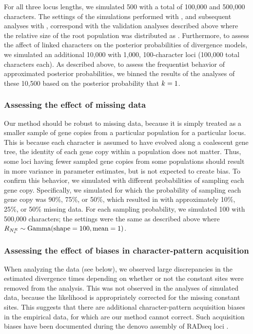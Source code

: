 For all three locus lengths, we simulated 500 \datasets with a total of 100,000
and 500,000 characters.
The settings of the simulations performed with \simcoevolity, and subsequent
analyses with \ecoevolity, correspond with the validation analyses described
above where the relative size of the root population was distributed as
.
Furthermore, to assess the affect of linked characters on the posterior
probabilities of divergence models, we simulated an additional 10,000 \datasets
with 1,000, 100-character loci (100,000 total characters each).
As described above, to assess the frequentist behavior of approximated
posterior probabilities, we binned the results of the analyses of these 10,500
\datasets based on the posterior probability that $k_{}{} = 1$.

\subsubsection{Assessing the effect of missing data}
Our method should be robust to missing data, because it is simply treated as a
smaller sample of gene copies from a particular population for a particular
locus.
This is because each character is assumed to have evolved along a coalescent
gene tree, the identity of each gene copy within a population does not matter.
Thus, some loci having fewer sampled gene copies from some populations should
result in more variance in parameter estimates, but is not expected to create
bias.
To confirm this behavior, we simulated \datasets with different probabilities of
sampling each gene copy.
Specifically, we simulated \datasets for which the probability of sampling each
gene copy was 90\%, 75\%, or 50\%, which resulted in \datasets with
approximately 10\%, 25\%, or 50\% missing data.
For each sampling probability, we simulated 100 \datasets with 500,000
characters; the settings were the same as described above where
$R_{N_{e}^{R{}}} \sim \textrm{Gamma}(\textrm{shape} = 100, \textrm{mean} = 1)$.

\subsubsection{Assessing the effect of biases in character-pattern acquisition}
When analyzing the  data (see below), we observed large
discrepancies in the estimated divergence times depending on whether or not the
constant sites were removed from the analysis.
This was not observed in the analyses of simulated data, because the likelihood
is appropriately corrected for the missing constant sites.
This suggests that there are additional character-pattern acquisition biases in
the empirical data, for which are our method cannot correct.
Such acquisition biases have been documented during the denovo assembly of
RADseq loci \citep{Harvey2015,Linck2017}.

